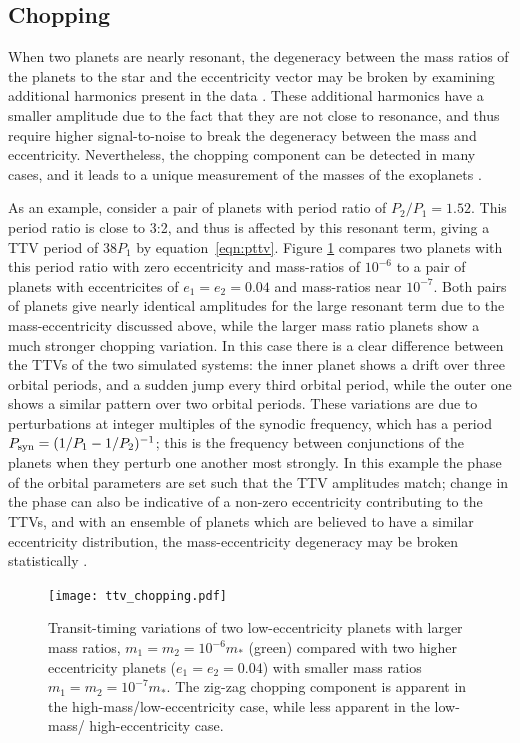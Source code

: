 \documentclass[graybox,natbib,nosecnum]{svmult}
\begin{document}
\subsection{Chopping}

When two planets are nearly resonant, the degeneracy between the mass ratios of the planets to the star
and the eccentricity vector may be broken by examining additional harmonics present in the data \citep{2015ApJ...802..116D}.
These additional harmonics have a smaller amplitude due to the fact that they are not close to resonance,
and thus require higher signal-to-noise to break the degeneracy between the mass and eccentricity.
Nevertheless, the chopping component can be detected in many cases, and it leads to a unique measurement
of the masses of the exoplanets \citep{2014ApJ...790...58N,2014ApJ...795..167S,2015ApJ...802..116D}.

As an example, consider a pair of planets with period ratio of $P_2/P_1 = 1.52$.  This period ratio
is close to 3:2, and thus is affected by this resonant term, giving a TTV period of $38 P_1$ by equation~\ref{eqn:pttv}.
Figure \ref{ttv_chopping} compares two planets with this period ratio with zero eccentricity
and mass-ratios of $10^{-6}$ to a pair of planets with eccentricites of $e_1=e_2=0.04$
and mass-ratios near $10^{-7}$.  Both pairs of planets give nearly identical amplitudes
for the large resonant term due to the mass-eccentricity discussed above, while the larger mass ratio planets show a 
much stronger chopping variation.  In this case there is a clear difference between the TTVs of the two simulated
systems:  the inner planet shows a drift over three orbital periods, and a sudden jump
every third orbital period, while the outer one shows a similar pattern over two orbital
periods.  These variations are due to perturbations at integer multiples of the synodic
frequency, which has a period $P_{\rm syn}= (1/P_1-1/P_2)^{-1}$; this is the frequency between conjunctions of
the planets when they perturb one another most strongly.  In this example the phase of the orbital parameters are set such that the TTV amplitudes match;  change
in the phase can also be indicative of a non-zero eccentricity contributing to the TTVs,
and with an ensemble of planets which are believed to have a similar eccentricity
distribution, the mass-eccentricity degeneracy may be broken statistically \citep{2012ApJ...761..122L,
2014ApJ...787...80H}.

\begin{figure}
\centerline{
\texttt{[image: ttv\_chopping.pdf]}}
%
\caption{Transit-timing variations of two low-eccentricity planets with larger
mass ratios, $m_1 = m_2 = 10^{-6} m_*$ (green) compared with two higher eccentricity planets ($e_1=e_2=0.04$)
with smaller mass ratios $m_1 = m_2 = 10^{-7} m_*$.  The zig-zag chopping component
is apparent in the high-mass/low-eccentricity case, while less apparent in the low-mass/
high-eccentricity case.}
\label{ttv_chopping}       %
\end{figure}
\end{document}
